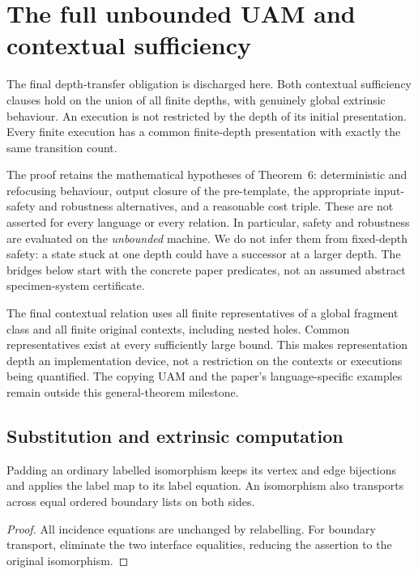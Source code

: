 \section{The full unbounded UAM and contextual sufficiency}
\label{sec:unbounded-theorem}
The final depth-transfer obligation is discharged here. Both contextual
sufficiency clauses hold on the union of all finite depths, with genuinely
global extrinsic behaviour. An execution is not restricted by the depth of
its initial presentation. Every finite execution has a common finite-depth
presentation with exactly the same transition count.

The proof retains the mathematical hypotheses of Theorem~6: deterministic
and refocusing behaviour, output closure of the pre-template, the appropriate
input-safety and robustness alternatives, and a reasonable cost triple.
These are not asserted for every language or every relation. In particular,
safety and robustness are evaluated on the \emph{unbounded} machine. We do
not infer them from fixed-depth safety: a state stuck at one depth could have
a successor at a larger depth. The bridges below start with the concrete
paper predicates, not an assumed abstract specimen-system certificate.

The final contextual relation uses all finite representatives of a global
fragment class and all finite original contexts, including nested holes.
Common representatives exist at every sufficiently large bound. This makes
representation depth an implementation device, not a restriction on the
contexts or executions being quantified. The copying UAM and the paper's
language-specific examples remain outside this general-theorem milestone.

\subsection{Substitution and extrinsic computation}


\begin{lemma}
Padding an ordinary labelled isomorphism keeps its vertex and edge bijections and applies the label map to its label equation. An isomorphism also transports across equal ordered boundary lists on both sides.
\end{lemma}

\begin{proof}
All incidence equations are unchanged by relabelling. For boundary transport, eliminate the two interface equalities, reducing the assertion to the original isomorphism.
\end{proof}

